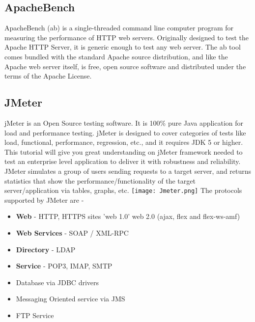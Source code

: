 \documentclass[../thesis.tex]{subfiles}
\begin{document}
\subsection{ApacheBench}
ApacheBench (ab) is a single-threaded command line computer program for measuring the performance of HTTP web servers. Originally designed to test the Apache HTTP Server, it is generic enough to test any web server.
The ab tool comes bundled with the standard Apache source distribution, and like the Apache web server itself, is free, open source software and distributed under the terms of the Apache License. \cite{ab}

\subsection{JMeter}
jMeter is an Open Source testing software. It is 100\% pure Java application for load and performance testing. jMeter is designed to cover categories of tests like load, functional, performance, regression, etc., and it requires JDK 5 or higher. This tutorial will give you great understanding on jMeter framework needed to test an enterprise level application to deliver it with robustness and reliability. \cite{jmeter}
\vspace{5mm}
JMeter simulates a group of users sending requests to a target server, and returns statistics that show the performance/functionality of the target server/application via tables, graphs, etc.
\vspace{5mm}
\texttt{[image: Jmeter.png]} 
\vspace{5mm}
The protocols supported by JMeter are -

\begin{itemize}
  \item \textbf{Web} - HTTP, HTTPS sites 'web 1.0' web 2.0 (ajax, flex and flex-ws-amf)
  \vspace{5mm}
  \item \textbf{Web Services} - SOAP / XML-RPC
  \vspace{5mm}
  \item \textbf{Directory} - LDAP
  \vspace{5mm}
  \item \textbf{Service} - POP3, IMAP, SMTP
  \vspace{5mm}
  \item Database via JDBC drivers
  \vspace{5mm}
  \item Messaging Oriented service via JMS
  \vspace{5mm}
  \item FTP Service
\end{itemize}
\end{document}
